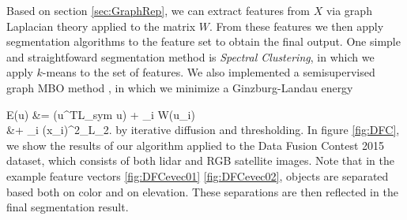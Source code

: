 \documentclass[journal]{IEEEtran}
\newenvironment{myalign}{\par\nobreak\noindent\align}{\endalign}
\begin{document}
Based on section \ref{sec:GraphRep}, we can extract features from $X$ via graph
Laplacian theory applied to the matrix $W$. From these features we then apply
segmentation algorithms to the feature set to obtain the final output. One
simple and straightfoward segmentation method is \emph{Spectral Clustering}, in
which we apply $k$-means to the set of features. We also implemented a
semisupervised graph MBO method \cite{MERKURJEV201429}, in which we minimize a
Ginzburg-Landau energy
\begin{myalign}\label{eqn:GinzburgLandauEnergy}
  E(u) &= \epsilon \cdot {}\left(u^TL_{sym} u\right) +
  \sum_i W(u_i) \\ &+ \sum_i
  \lambda(x_i)^2_{L_2}.
\end{myalign}
by iterative diffusion and thresholding. In figure \ref{fig:DFC}, we show the
results of our algorithm applied to the Data Fusion Contest 2015 dataset, which
consists of both lidar and RGB satellite images. Note that in the example
feature vectors \ref{fig:DFCevec01} \ref{fig:DFCevec02}, objects are separated
based both on color and on elevation. These separations are then reflected in
the final segmentation result.
\end{document}
